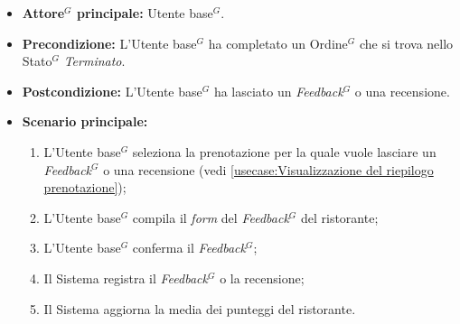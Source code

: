 \label{usecase:Inserimento di \gls{Feedback}$^G$ e recensioni}
\begin{itemize}
	\item \textbf{\gls{Attore}$^G$ principale:} \gls{Utente base}$^G$.

	\item \textbf{Precondizione:} L'\gls{Utente base}$^G$ ha completato un \gls{Ordine}$^G$ che si
	      trova nello \gls{Stato}$^G$ \textit{Terminato}.

	\item \textbf{Postcondizione:} L'\gls{Utente base}$^G$ ha lasciato un \textit{\gls{Feedback}$^G$} o una recensione.

	\item \textbf{Scenario principale:}
	      \begin{enumerate}
		      \item L'\gls{Utente base}$^G$ seleziona la prenotazione per la quale vuole
		            lasciare un \textit{\gls{Feedback}$^G$} o una recensione (vedi
		            \autoref{usecase:Visualizzazione del riepilogo prenotazione});

		      \item L'\gls{Utente base}$^G$ compila il \textit{form} del \textit{\gls{Feedback}$^G$} del ristorante;

		      \item L'\gls{Utente base}$^G$ conferma il \textit{\gls{Feedback}$^G$};

		      \item Il Sistema registra il \textit{\gls{Feedback}$^G$} o la recensione;

		      \item Il Sistema aggiorna la media dei punteggi del ristorante.

	      \end{enumerate}
\end{itemize}
